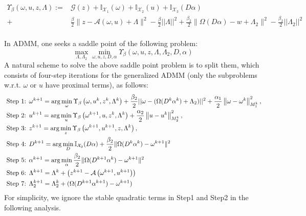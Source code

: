 \documentclass{article}
\numberwithin{equation}{section}
\begin{document}
\begin{equation}
\begin{aligned}
\Upsilon_{\beta}(\omega, u, z, \Lambda):=&\mathcal{G}(z)+\mathbb{I}_{\mathcal{X}_{1}}(\omega)+\mathbb{I}_{\mathcal{X}_{2}}(u)+ \mathbb{I}_{\mathcal{X}_{3}}(D\alpha)  \\
+&\frac{\beta}{2}\|z-\mathcal{A}(\omega, u) + \Lambda \|^{2} - \frac{\beta}{2}||\Lambda||^2 +\frac{\beta_2}{2}\| \Omega(D\alpha) - w + \Lambda_2\|^{2} - \frac{\beta_2}{2}||\Lambda_2||^2 \\
\end{aligned}
\end{equation} 

In ADMM, one seeks a saddle point of the following problem:
$$
\max _{\Lambda,\Lambda_2} \min _{\omega, u, z,D,\alpha} \Upsilon_{\beta}(\omega, u, z, \Lambda,\Lambda_2,D,\alpha)
$$
A natural scheme to solve the above saddle point problem is to split them, which consists of four-step iterations for the generalized ADMM (only the subproblems w.r.t. $\omega$ or $u$ have proximal terms), as follows:
\begin{align}
\text { Step 1: } & \omega^{k+1}=\arg \min _{\omega} \Upsilon_{\beta}\left(\omega, u^{k}, z^{k}, \Lambda^{k}\right)+
\frac{\beta_{2}}{2}||\omega - (\Omega(D^k\alpha^k) + \Lambda_2)||^2 + 
\frac{\alpha_{1}}{2}\left\|\omega-\omega^{k}\right\|_{M_{1}^{k}}^{2}, \notag \\
 \text { Step 2: } & u^{k+1}=\arg \min _{u} \Upsilon_{\beta}\left(\omega^{k+1}, u, z^{k}, \Lambda^{k}\right)+\frac{\alpha_{2}}{2}\left\|u-u^{k}\right\|_{M_{2}^{k}}^{2}, \notag \\ \text { Step 3: } & z^{k+1}=\arg \min _{z} \Upsilon_{\beta}\left(\omega^{k+1}, u^{k+1}, z, \Lambda^{k}\right), \notag \\
 \text { Step 4: } & D^{k+1}=\arg \min _{D} \mathbb{I}_{\mathcal{X}_{3}}(D\alpha) +
  \frac{\beta_2}{2}\| \Omega(D^k\alpha^k) - \omega^{k+1}\|^{2} \notag \\
 \text { Step 5: } & \alpha^{k+1}=\arg \min _{\alpha}  \frac{\beta_2}{2}\| \Omega(D^{k+1}\alpha^k) - \omega^{k+1}\|^{2}\notag \\
  \text { Step 6: } &
 \Lambda^{k+1}=\Lambda^{k}+\left(z^{k+1}-\mathcal{A}\left(\omega^{k+1}, u^{k+1}\right)\right)  \label{Lup}\\
 \text { Step 7: } & \Lambda_2^{k+1}=\Lambda_2^{k}+ (\Omega(D^{k+1}\alpha^{k+1}) - \omega^{k+1}) \label{L2up}
 \end{align}
For simplicity, we ignore the stable quadratic terms in Step1 and Step2 in the following analysis.
\end{document}
